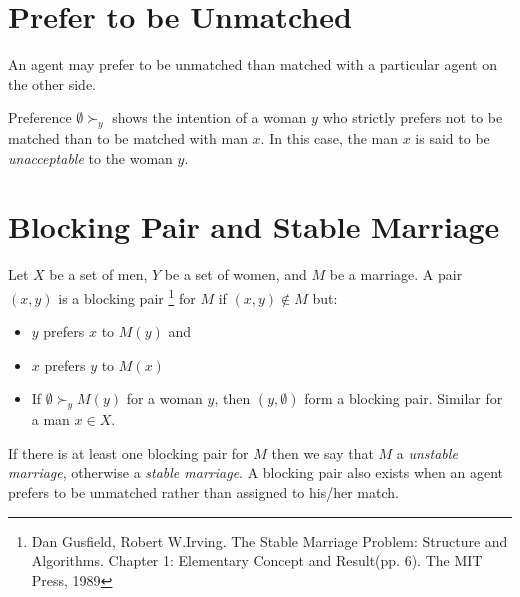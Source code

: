 \section{Prefer to be Unmatched}
An agent may prefer to be unmatched than matched with a particular agent on the other side.
\begin{exmp}
    Preference $\emptyset \succ_y $ shows the intention of a woman $y$ who strictly prefers not to be matched than to be matched with man $x$.
In this case, the man $x$ is said to be \emph{unacceptable} to the woman $y$. 
\end{exmp}

\section{Blocking Pair and Stable Marriage}
\begin{description}[leftmargin=1em+5mm, labelindent=5mm]
\item[Blocking Pair - Definition] Let $X$ be a set of men, $Y$ be a set of women, and $M$ be a marriage. A
pair $(x, y)$ is a blocking pair \footnote{Dan Gusfield, Robert W.Irving. The Stable Marriage Problem: Structure and Algorithms. Chapter 1: Elementary Concept and Result(pp. 6). The MIT Press, 1989} for $M$ if $(x, y) \notin M$ but:
\begin{itemize}[leftmargin=1em+8mm]
    \item $y$ prefers $x$ to $M(y)$ and
    \item $x$ prefers $y$ to $M(x)$
    \item If $\emptyset \succ_y M(y)$ for a woman $y$, then $(y, \emptyset)$ form a blocking pair. Similar for a man $x \in X$.
\end{itemize}
\vspace{5mm}
\item[Unstable Marriage and Stable Marriage - Definition]If there is at least one blocking pair for $M$ then we say that $M$ a \emph{unstable marriage}, otherwise a \emph{stable marriage}.
A blocking pair also exists when an agent prefers to be unmatched rather than assigned to his/her match. \\
\end{description}
